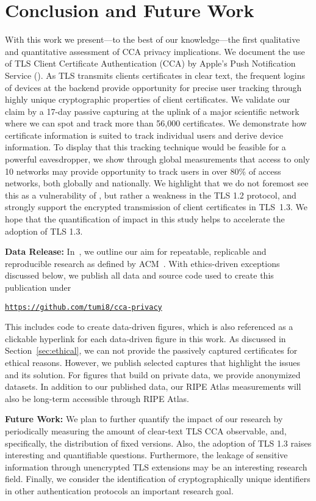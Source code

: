 \section{Conclusion and Future Work}\label{sec:summary}
With this work we present---to the best of our knowledge---the first qualitative and
quantitative assessment of CCA privacy implications.
We document the use of TLS Client Certificate Authentication (CCA) by Apple's
Push Notification Service (\apns). As TLS transmits clients certificates in
clear text, the frequent logins of devices at the {\apns} backend provide
opportunity for precise user tracking through highly unique cryptographic
properties of client certificates. We validate our claim by a 17-day passive
capturing at the uplink of a major scientific network where we can spot and
track more than 56,000 {\apns} certificates. We demonstrate how certificate information is suited to
track individual users and derive device information. To display that this
tracking technique would be feasible for a powerful eavesdropper, we show
through global measurements that access to only 10 networks may provide
opportunity to track {\apns} users in over 80\% of access networks, both globally
and nationally.
We highlight that we do not foremost see this as a vulnerability of \apns, but rather a weakness in the TLS 1.2 protocol, and strongly support the
encrypted transmission of client certificates in TLS~1.3.
We hope that the quantification of impact in this study helps to accelerate the adoption of TLS 1.3.

\textbf{Data Release: }
In~\cite{reproduc2017}, we outline our aim for repeatable, replicable and reproducible research as defined by ACM~\cite{AcmArtifacts}.
With ethics-driven exceptions discussed below, we publish all data and source code used to create this publication under \\ 
\centerline{\texttt{\url{https://github.com/tumi8/cca-privacy}}}
This includes code to create data-driven figures, which is also referenced as a clickable hyperlink for each data-driven figure in this work. 
As discussed in Section~\ref{sec:ethical}, we can not provide the passively captured {\apns} certificates for ethical reasons.
However, we publish selected captures that highlight the issues and its solution. 
For figures that build on private data, we provide anonymized datasets.
In addition to our published data, our RIPE Atlas measurements will also be long-term accessible through RIPE Atlas. 

\textbf{Future Work: }%
We plan to further quantify the impact of our research by periodically measuring the amount of clear-text TLS CCA observable, and, specifically, the distribution of fixed {\apns} versions.
Also, the adoption of TLS 1.3 raises interesting and quantifiable questions.
Furthermore, the leakage of sensitive information through unencrypted TLS extensions may be an interesting research field.
Finally, we consider the identification of cryptographically unique identifiers in other authentication protocols an important research goal.

